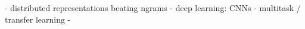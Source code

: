 - distributed representations beating ngrams
- deep learning: CNNs
- multitask / transfer learning
-


%
%
%
%
%
%
%
%
%
%
%
%
%
%
%
%
%
%
%
%
%


